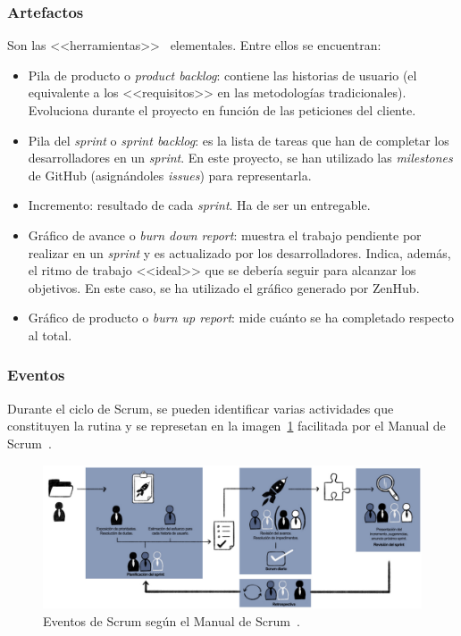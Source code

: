 \subsubsection{Artefactos}

Son las <<herramientas>>~\cite{scrumMaster2022} elementales. Entre ellos se encuentran:

\begin{itemize}
	\item Pila de producto o \textit{product backlog}: contiene las historias de usuario (el equivalente a los <<requisitos>> en las metodologías tradicionales). Evoluciona durante el proyecto en función de las peticiones del cliente.
	\item Pila del \textit{sprint} o \textit{sprint backlog}: es la lista de tareas que han de completar los desarrolladores en un \textit{sprint}. En este proyecto, se han utilizado las \textit{milestones} de GitHub (asignándoles \textit{issues}) para representarla.
	\item Incremento: resultado de cada \textit{sprint}. Ha de ser un entregable.
	\item Gráfico de avance o \textit{burn down report}: muestra el trabajo pendiente por realizar en un \textit{sprint} y es actualizado por los desarrolladores. Indica, además, el ritmo de trabajo <<ideal>> que se debería seguir para alcanzar los objetivos. En este caso, se ha utilizado el gráfico generado por ZenHub.
	\item Gráfico de producto o \textit{burn up report}: mide cuánto se ha completado respecto al total.
\end{itemize}

\subsubsection{Eventos}
Durante el ciclo de Scrum, se pueden identificar varias actividades que constituyen la rutina y se represetan en la imagen~\ref{img:eventos_scrum} facilitada por el Manual de Scrum~\cite{scrumMaster2022}.

\begin{figure}[h]
	\caption[Scrum: eventos]{Eventos de Scrum según el Manual de Scrum~\cite{scrumMaster2022}.}
	\label{img:eventos_scrum}
	\centering
	\includegraphics[width=\textwidth]{../img/anexos/scrum/eventos}
\end{figure}

